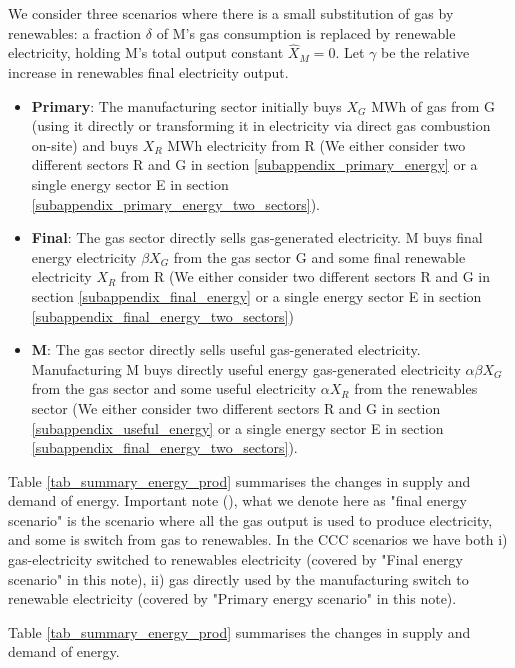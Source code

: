 \documentclass[11pt]{article}
\begin{document}
We consider three scenarios where there is a small substitution of gas by renewables: a fraction $\delta$ of M's gas consumption is replaced by renewable electricity, holding M's total output constant $\hat{X}_M=0$. Let $\gamma$ be the relative increase in renewables final electricity output.
\begin{itemize}
\item \textbf{Primary}: The manufacturing sector initially buys $X_G$ MWh of gas from G (using it directly or transforming it in electricity via direct gas combustion on-site) and buys $X_R$ MWh electricity from R (We either consider two different sectors R and G in section \ref{subappendix_primary_energy} or a single energy sector E in section \ref{subappendix_primary_energy_two_sectors}).
\item \textbf{Final}: The gas sector directly sells gas-generated electricity. M buys final energy electricity $\beta X_G$ from the gas sector G and some final renewable electricity  $X_R$  from R (We either consider two different sectors R and G in section \ref{subappendix_final_energy} or a single energy sector E in section \ref{subappendix_final_energy_two_sectors})
\item \textbf{M}: The gas sector directly sells useful gas-generated electricity. Manufacturing M buys directly useful energy gas-generated electricity $\alpha \beta X_G$ from the gas sector and some useful electricity $\alpha X_R$ from the renewables sector 
(We either consider two different sectors R and G in section \ref{subappendix_useful_energy} or a single energy sector E in section \ref{subappendix_final_energy_two_sectors}).
\end{itemize}



 
 
 Table \ref{tab_summary_energy_prod} summarises the changes in supply and demand of energy.
 Important note (), what we denote here as "final energy scenario" is the scenario where all the gas output is used to produce electricity, and some is switch from gas to renewables. In the CCC scenarios we have both i) gas-electricity switched to renewables electricity (covered by "Final energy scenario" in this note), ii) gas directly used by the manufacturing switch to renewable electricity (covered by "Primary energy scenario" in this note).  

 

 Table \ref{tab_summary_energy_prod} summarises the changes in supply and demand of energy.
\end{document}

